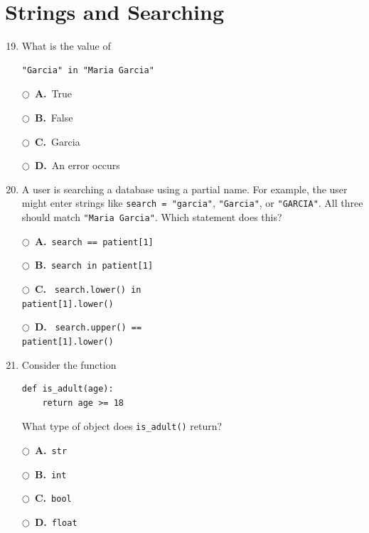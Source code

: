 \documentclass[11pt]{article}
\newcommand{\choice}[2]{%
    \par\noindent
    \(\bigcirc\)\ \textbf{#1.}\ #2
}
\begin{document}
\section*{Strings and Searching}

\begin{enumerate}
\setcounter{enumi}{18}


\item What is the value of

\begin{verbatim}
"Garcia" in "Maria Garcia"
\end{verbatim}

\choice{A}{True}
\choice{B}{False}
\choice{C}{Garcia}
\choice{D}{An error occurs}



\item A user is searching a database using a partial name. For example, the user might enter strings like \texttt{search = "garcia"}, \texttt{"Garcia"}, or \texttt{"GARCIA"}.  All three should match \texttt{"Maria Garcia"}.  Which statement does this?

\choice{A}{\texttt{search == patient[1]}}

\choice{B}{\texttt{search in patient[1]}}

\choice{C}{
\texttt{search.lower() in}\\
\texttt{patient[1].lower()}
}

\choice{D}{
\texttt{search.upper() ==}\\
\texttt{patient[1].lower()}
}



\item Consider the function

\begin{verbatim}
def is_adult(age):
    return age >= 18
\end{verbatim}

What type of object does \texttt{is\_adult()} return?

\choice{A}{\texttt{str}}
\choice{B}{\texttt{int}}
\choice{C}{\texttt{bool}}
\choice{D}{\texttt{float}}

\end{enumerate}
\end{document}
